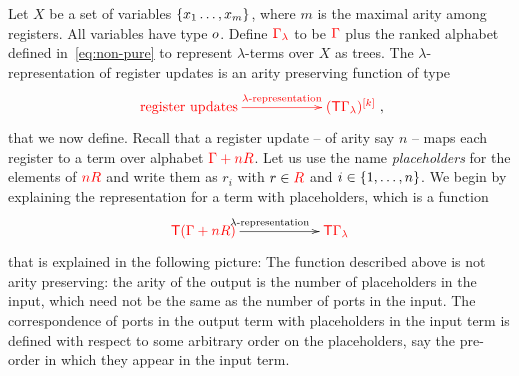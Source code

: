 Let $X$ be a set of variables $\{x_1\dots,x_m\}$, where $m$ is the maximal arity among registers. All  variables have  type $o$.  Define  ${\color{red}{\Gamma_\lambda}}$ to be ${\color{red}{\Gamma}}$ plus the ranked alphabet defined in~\eqref{eq:non-pure} to represent $\lambda$-terms over $X$ as trees.  The     $\lambda$-representation of register updates is an  arity preserving function of type
\begin{align}\label{eq:lambda-representation-regup}
\ranked{
    \xymatrix@C=2cm{
 \text{register updates}    \ar[r]^-{\text{$\lambda$-representation}} &
 \mati k {(\tmonad\Gamma_\lambda)}
}
},
\end{align}
that we now define.  
Recall that a register update -- of arity say $n$ -- maps each register to a term over alphabet ${\color{red}{\Gamma + n{{\color{red}{R}}}}}$. Let us use the name \emph{placeholders} for the elements of ${\color{red}{n {{\color{red}{R}}}}}$ and write them as $r_i$ with $r \in {{\color{red}{R}}}$ and  $i \in \{1,\ldots,n\}$.
We begin by explaining the representation for  a term with  placeholders, which is a function
\begin{align}\label{eq:placeholders}
\xymatrix@C=2cm{
    \ranked{\tmonad(\rGamma+n R)} \ar[r]^{\text{$\lambda$-representation}} &
    \ranked{\tmonad {\Gamma_\lambda}}
}
\end{align}
that is explained in the following picture:
The function described above is not arity preserving: the arity of the output is the number of placeholders in the input, which need not be the same as the number of ports in the input. The correspondence of ports in the output term with placeholders in the input term is defined with respect to some arbitrary order on the placeholders, say the pre-order in which they appear in the input term. 


